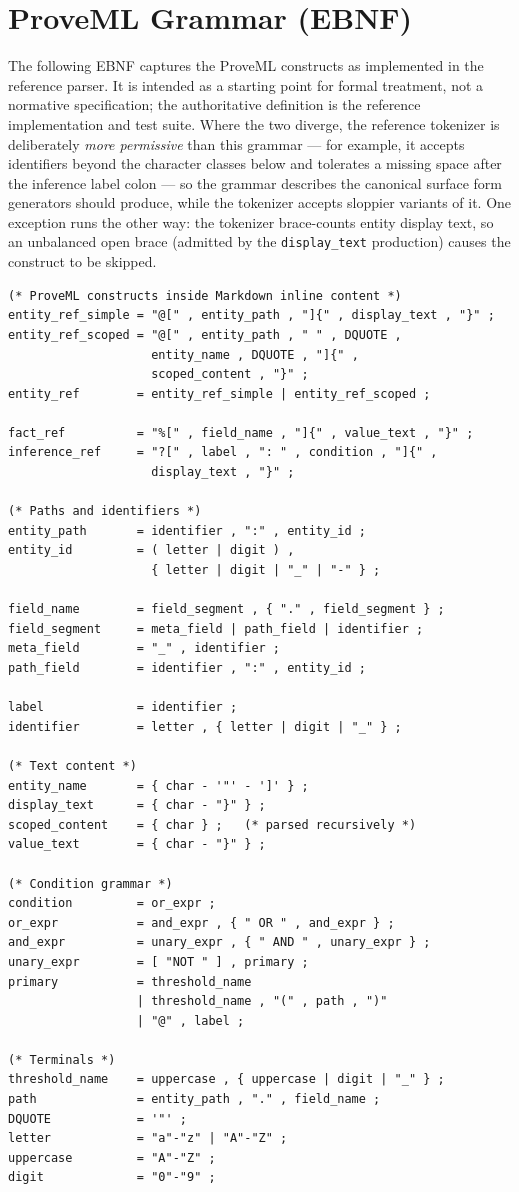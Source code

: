 \documentclass[11pt,a4paper]{article}
\begin{document}
\section{ProveML Grammar (EBNF)}
\label{app:grammar}

The following EBNF captures the ProveML constructs as implemented in the reference parser. It is intended as a starting point for formal treatment, not a normative specification; the authoritative definition is the reference implementation and test suite. Where the two diverge, the reference tokenizer is deliberately \textit{more permissive} than this grammar --- for example, it accepts identifiers beyond the character classes below and tolerates a missing space after the inference label colon --- so the grammar describes the canonical surface form generators should produce, while the tokenizer accepts sloppier variants of it. One exception runs the other way: the tokenizer brace-counts entity display text, so an unbalanced open brace (admitted by the \texttt{display\_text} production) causes the construct to be skipped.

\begin{lstlisting}
(* ProveML constructs inside Markdown inline content *)
entity_ref_simple = "@[" , entity_path , "]{" , display_text , "}" ;
entity_ref_scoped = "@[" , entity_path , " " , DQUOTE ,
                    entity_name , DQUOTE , "]{" ,
                    scoped_content , "}" ;
entity_ref        = entity_ref_simple | entity_ref_scoped ;

fact_ref          = "%[" , field_name , "]{" , value_text , "}" ;
inference_ref     = "?[" , label , ": " , condition , "]{" ,
                    display_text , "}" ;

(* Paths and identifiers *)
entity_path       = identifier , ":" , entity_id ;
entity_id         = ( letter | digit ) ,
                    { letter | digit | "_" | "-" } ;

field_name        = field_segment , { "." , field_segment } ;
field_segment     = meta_field | path_field | identifier ;
meta_field        = "_" , identifier ;
path_field        = identifier , ":" , entity_id ;

label             = identifier ;
identifier        = letter , { letter | digit | "_" } ;

(* Text content *)
entity_name       = { char - '"' - ']' } ;
display_text      = { char - "}" } ;
scoped_content    = { char } ;   (* parsed recursively *)
value_text        = { char - "}" } ;

(* Condition grammar *)
condition         = or_expr ;
or_expr           = and_expr , { " OR " , and_expr } ;
and_expr          = unary_expr , { " AND " , unary_expr } ;
unary_expr        = [ "NOT " ] , primary ;
primary           = threshold_name
                  | threshold_name , "(" , path , ")"
                  | "@" , label ;

(* Terminals *)
threshold_name    = uppercase , { uppercase | digit | "_" } ;
path              = entity_path , "." , field_name ;
DQUOTE            = '"' ;
letter            = "a"-"z" | "A"-"Z" ;
uppercase         = "A"-"Z" ;
digit             = "0"-"9" ;
\end{lstlisting}
\end{document}
